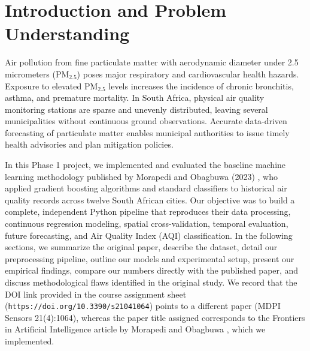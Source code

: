 \section{Introduction and Problem Understanding}
Air pollution from fine particulate matter with aerodynamic diameter under 2.5 micrometers ($\text{PM}_{2.5}$) poses major respiratory and cardiovascular health hazards. Exposure to elevated $\text{PM}_{2.5}$ levels increases the incidence of chronic bronchitis, asthma, and premature mortality. In South Africa, physical air quality monitoring stations are sparse and unevenly distributed, leaving several municipalities without continuous ground observations. Accurate data-driven forecasting of particulate matter enables municipal authorities to issue timely health advisories and plan mitigation policies.

In this Phase 1 project, we implemented and evaluated the baseline machine learning methodology published by Morapedi and Obagbuwa (2023) \cite{morapedi2023air}, who applied gradient boosting algorithms and standard classifiers to historical air quality records across twelve South African cities. Our objective was to build a complete, independent Python pipeline that reproduces their data processing, continuous regression modeling, spatial cross-validation, temporal evaluation, future forecasting, and Air Quality Index (AQI) classification. In the following sections, we summarize the original paper, describe the dataset, detail our preprocessing pipeline, outline our models and experimental setup, present our empirical findings, compare our numbers directly with the published paper, and discuss methodological flaws identified in the original study. We record that the DOI link provided in the course assignment sheet (\texttt{https://doi.org/10.3390/s21041064}) points to a different paper (MDPI Sensors 21(4):1064), whereas the paper title assigned corresponds to the Frontiers in Artificial Intelligence article by Morapedi and Obagbuwa \cite{morapedi2023air}, which we implemented.
